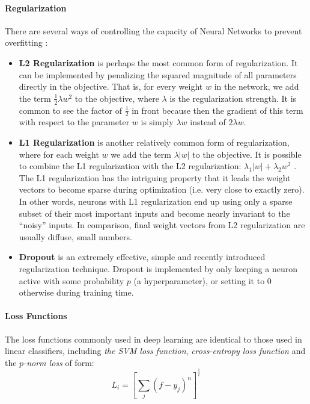 \documentclass[10pt,twocolumn,letterpaper]{article}
\begin{document}
\paragraph{Regularization}
	There are several ways of controlling the capacity of Neural Networks to prevent overfitting \cite{svmCS231n}:
\begin{itemize}
\item \textbf{L2 Regularization} is perhaps the most common form of regularization. It can be implemented by penalizing the squared magnitude of all parameters directly in the objective. That is, for every weight $w$ in the network, we add the term $\frac{1}{2}\lambda w^2$ to the objective, where $\lambda$ is the regularization strength. It is common to see the factor of $\frac{1}{2}$ in front because then the gradient of this term with respect to the parameter $w$ is simply $\lambda w$ instead of $2\lambda w$.

\item \textbf{L1 Regularization} is another relatively common form of regularization, where for each weight $w$ we add the term $\lambda \left| w \right|$ to the objective. It is possible to combine the L1 regularization with the L2 regularization: $\lambda_1 \left| w \right| + \lambda_2 w^2$ \cite{Zou2005Zou}. The L1 regularization has the intriguing property that it leads the weight vectors to become sparse during optimization (i.e. very close to exactly zero). In other words, neurons with L1 regularization end up using only a sparse subset of their most important inputs and become nearly invariant to the ``noisy'' inputs. In comparison, final weight vectors from L2 regularization are usually diffuse, small numbers.

\item \textbf{Dropout} is an extremely effective, simple and recently introduced regularization technique. Dropout is implemented by only keeping a neuron active with some probability $p$ (a hyperparameter), or setting it to 0 otherwise during training time.
\end{itemize}

\paragraph{Loss Functions}
	The loss functions commonly used in deep learning are identical to those used in linear classifiers, including \emph{the SVM loss function}, \emph{cross-entropy loss function} and the \emph{$p$-norm loss} of form:
\begin{equation}
	L_i = {\left[ \sum_j {\left( f - y_j \right)}^n \right]}^{\frac{1}{i}}
\end{equation}
	
\end{document}
